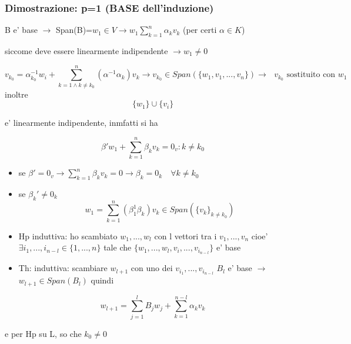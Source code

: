 \documentclass{article}
\begin{document}
\subsubsection*{Dimostrazione: p=1 (BASE dell'induzione)}
\begin{flushleft}
	B e' base $\to$ Span(B)=$w_1 \in V \to w_1 \sum_{k=1}^n \alpha_k v_k $ (per certi $\alpha \in K$)
\end{flushleft}
\begin{flushleft}
	siccome deve essere linearmente indipendente $\to w_1 \neq 0$
\end{flushleft}
\begin{equation*}
	v_{k_0}= \alpha^{-1}_{k_0} w_i + \sum^n_{k=1 \land k \neq k_0} ( \alpha^{-1}\alpha_k)v_k \to v_{k_0} \in Span(\{w_1,v_1,...,v_n \})\to \text{ $v_{k_0}$ sostituito con $w_1$}
\end{equation*}
inoltre
\begin{equation*}
	\{w_1 \} \cup \{ v_i \}
\end{equation*}
\begin{flushleft}
	e' linearmente indipendente, inmfatti si ha
\end{flushleft}
\begin{equation*}
	\beta' w_1 + \sum_{k=1}^n \beta_k v_k = 0_v : k \neq k_0
\end{equation*}
\begin{itemize}
	\item se $\beta' = 0_v \to \sum^n_{k=1}\beta_k v_k = 0 \to \beta_k=0_k \quad \forall k \neq k_0$
	\item se $\beta_k' \neq 0_k $
	      \begin{equation*}
		      w_1 = \sum_{k=1}^n (\beta_1^1 \beta_k) v_k \in Span(\{v_k\}_{k \neq k_0})
	      \end{equation*}
\end{itemize}
\begin{itemize}
	\item Hp induttiva: ho scambiato $w_1,...,w_l$ con l vettori tra i $v_1,...,v_n$ cioe'
	      $\exists i_1,...,i_{n-l} \in \{1,...,n \}$ tale che $\{w_1,...,w_l,v_i,...,v_{i_{n-l}} \}$ e' base
	\item Th: induttiva: scambiare $w_{l+1}$ con uno dei $v_{i_1},...,v_{i_{n-l}}$ $B_l$ e' base $\to$ $w_{l+1} \in Span(B_l)$ quindi
\end{itemize}
\begin{equation*}
	w_{l+1} = \sum_{j=1}^l B_j w_j + \sum_{k=1}^{n-l} \alpha_k v_k
\end{equation*}
\begin{flushleft}
	e per Hp su L, so che $k_0 \neq 0$
\end{flushleft}
\end{document}
